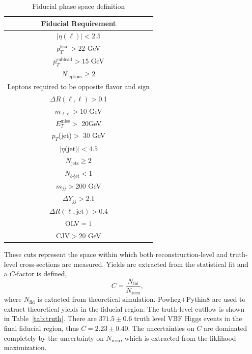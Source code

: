 \begin{table}[!ht]
\centering
\begin{tabular}{|c|}
\hline
Fiducial Requirement \\
\hline
$|\eta(\ell)|<2.5$ \\
$p_T^{\text{lead}}>22$ GeV \\
$p_T^{\text{sublead}}>15$ GeV \\
$N_{\text{leptons}}\geq2$ \\
Leptons required to be opposite flavor and sign \\
$\Delta R(\ell,\ell) >$0.1 \\
$m_{\ell\ell}>10$ GeV \\
$E_T^{\text{miss}}>$ 20GeV \\
$p_T$(jet)$>$ 30 GeV \\
$|\eta\text{(jet)}|<4.5$ \\ 
$N_{\text{jets}} \geq 2$ \\
$N_{b\text{-jet}} < 1$ \\
$m_{jj} >200$ GeV \\
$\Delta Y_{jj}>2.1$ \\
$\Delta R(\ell,\text{jet})>0.4$ \\
OLV$=1$ \\
CJV$>20$ GeV \\
\hline
\end{tabular}
\caption{Fiducial phase space definition}
\label{tab:fiducial}
\end{table}
These cuts represent the space within which both reconstruction-level and truth-level cross-sections are measured. Yields are extracted from the statistical fit and a $C$-factor is defined, 
\begin{equation}
C = \frac{N_\text{fid}}{N_{\text{reco}}},
\end{equation}
where $N_\text{fid}$ is extacted from theoretical simulation. Powheg$+$Pythia8 are used to extract theoretical yields in the fiducial region. The truth-level cutflow is shown in Table~\ref{tab:truth}. There are $371.5\pm0.6$ truth level VBF Higgs events in the final fiducial region, thus $C=2.23\pm 0.40$. The uncertainties on $C$ are dominated completely by the uncertainty on $N_{\text{reco}}$, which is extracted from the liklihood maximization.  

